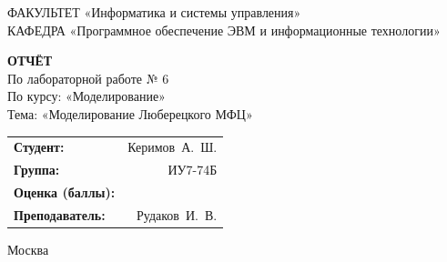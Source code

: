 \begin{titlepage}
{	{\doublespacing \small \raggedright ФАКУЛЬТЕТ \hspace{37mm} «Информатика и системы управления»\\
	КАФЕДРА \hspace{17mm} «Программное обеспечение ЭВМ и информационные технологии»\\}

	\vspace{30mm}

	\textbf{ОТЧЁТ}\\
	По лабораторной работе № 6\\
	По курсу: «Моделирование»\\
	Тема: «Моделирование Люберецкого МФЦ»\\

	\vspace{40mm}

	\begin{flushleft}
		\begin{tabular}{lr}
			\textbf{Студент:}        & Керимов~А.~Ш. \\
			\textbf{Группа:}         & ИУ7-74Б       \\
			\textbf{Оценка (баллы):} & \hrulefill    \\
			\textbf{Преподаватель:}  & Рудаков~И.~В. \\
		\end{tabular}
	\end{flushleft}

	\vfill

	Москва\\
	\the\year\\}
\end{titlepage}

\setcounter{page}{2}
